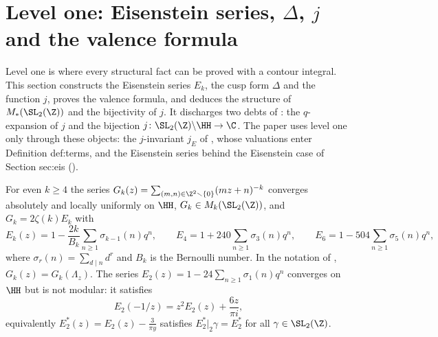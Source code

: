 \section{Level one: Eisenstein series, \texorpdfstring{$\Delta$}{Delta}, \texorpdfstring{$j$}{j} and the valence formula}\label{sec:modforms:level-one}

Level one is where every structural fact can be proved with a contour integral. This section constructs the Eisenstein series $E_k$, the cusp form $\Delta$ and
the function $j$, proves the valence formula, and deduces the structure of $M_*(\SL_2(\Z))$ and the bijectivity of $j$. It discharges two debts of
: the $q$-expansion of $j$ and the bijection $j\colon\SL_2(\Z)\backslash\HH\to\C$. The paper uses level one only through these objects: the $j$-invariant $j_E$ of
, whose valuations enter Definition def:terms, and the Eisenstein series behind the Eisenstein case of Section sec:eis ().

\begin{proposition}\label{prop:modforms:eisenstein-level-one}
For even $k\ge4$ the series $G_k(z)=\sum_{(m,n)\in\Z^2\smallsetminus\{0\}}(mz+n)^{-k}$ converges absolutely and locally uniformly on $\HH$, $G_k\in M_k(\SL_2(\Z))$, and $G_k=2\zeta(k)E_k$ with
\[
E_k(z)=1-\frac{2k}{B_k}\sum_{n\ge1}\sigma_{k-1}(n)q^n,\qquad E_4=1+240\sum_{n\ge1}\sigma_3(n)q^n,\qquad E_6=1-504\sum_{n\ge1}\sigma_5(n)q^n,
\]
where $\sigma_r(n)=\sum_{d\mid n}d^r$ and $B_k$ is the Bernoulli number. In the notation of , $G_k(z)=G_k(\Lambda_z)$. The series
$E_2(z)=1-24\sum_{n\ge1}\sigma_1(n)q^n$ converges on $\HH$ but is not modular: it satisfies
\[
E_2(-1/z)=z^2E_2(z)+\frac{6z}{\pi i},
\]
equivalently $E_2^*(z)=E_2(z)-\frac3{\pi y}$ satisfies $E_2^*|_2\gamma=E_2^*$ for all $\gamma\in\SL_2(\Z)$.
\end{proposition}

